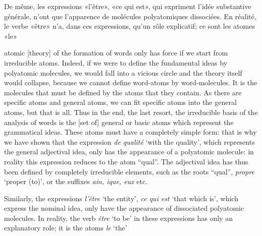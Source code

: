 \begin{sloppypar}
{  De même, les expressions «l’être», «ce qui est», qui expriment
  l’idée substantive générale, n’ont que l’apparence de molécules
  polyatomiques dissociées. En réalité, le verbe «être» n’a, dans ces
  expressions, qu’un rôle explicatif; ce sont les atomes «le» }
{\noindent atomic {[theory]} of the formation of words only has force
  if we start from irreducible atoms. Indeed, if we were to define the
  fundamental ideas by polyatomic molecules, we would fall into a
  vicious circle and the theory itself would collapse, because we
  cannot define word-atoms by word-molecules. It is the molecules that
  must be defined by the atoms that they contain.  As there are
  specific atoms and general atoms, we can fit specific atoms into the
  general atoms, but that is all. Thus in the end, the last resort,
  the irreducible basis of the analysis of words is the {[set of]}
  general or basic atoms which represent the grammatical ideas. These
  atoms must have a completely simple form: that is why we have shown
  that the expression \emph{de qualité} `with the quality', which
  represents the general adjectival idea, only has the appearance of a
  polyatomic molecule: in reality this expression reduces to the atom
  ``qual''. The adjectival idea has thus been defined by completely
  irreducible elements, such as the roots ``qual'', \emph{propre}
  `proper (to)', or the suffixes \emph{ain, ique, eux} etc.

  Similarly, the expressions \emph{l'être} `the entity', \emph{ce
    qui est} `that which is', which express the nominal idea, only
  have the appearance of dissociated polyatomic molecules. In reality,
  the verb \emph{être} `to be' in these expressions has only an
  explanatory role; it is the atoms \emph{le} `the' }

\end{sloppypar}
